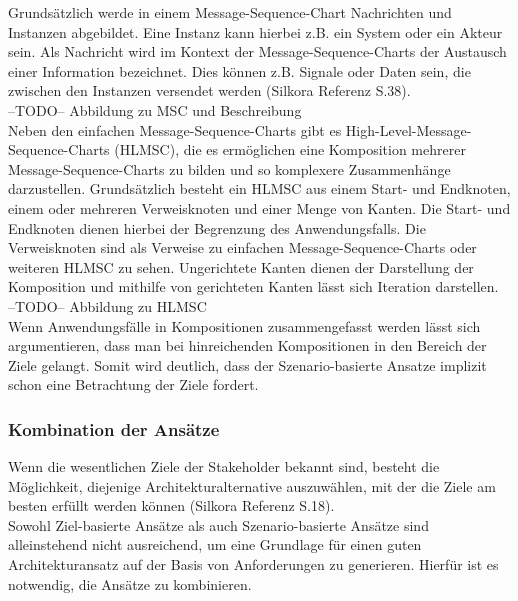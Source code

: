 Grundsätzlich werde in einem Message-Sequence-Chart Nachrichten und Instanzen abgebildet. Eine Instanz kann hierbei z.B. ein System oder ein Akteur sein. Als Nachricht wird im Kontext der Message-Sequence-Charts der Austausch einer Information bezeichnet. Dies können z.B. Signale oder Daten sein, die zwischen den Instanzen versendet werden (Silkora Referenz S.38). \\

--TODO-- Abbildung zu MSC und Beschreibung\\

Neben den einfachen Message-Sequence-Charts gibt es High-Level-Message-Sequence-Charts (HLMSC), die es ermöglichen eine Komposition mehrerer Message-Sequence-Charts zu bilden und so komplexere Zusammenhänge darzustellen. Grundsätzlich besteht ein HLMSC aus einem Start- und Endknoten, einem oder mehreren Verweisknoten und einer Menge von Kanten. Die Start- und Endknoten dienen hierbei der Begrenzung des Anwendungsfalls.  Die Verweisknoten sind als Verweise zu einfachen Message-Sequence-Charts oder weiteren HLMSC zu sehen. Ungerichtete Kanten dienen der Darstellung der Komposition und mithilfe von gerichteten Kanten lässt sich Iteration darstellen.\\

--TODO-- Abbildung zu HLMSC \\

Wenn Anwendungsfälle in Kompositionen zusammengefasst werden lässt sich argumentieren, dass man bei hinreichenden Kompositionen in den Bereich der Ziele gelangt. Somit wird deutlich, dass der Szenario-basierte Ansatze implizit schon eine Betrachtung der Ziele fordert.\\

\subsubsection{Kombination der Ans\"atze}
Wenn die wesentlichen Ziele der Stakeholder bekannt sind, besteht die M\"oglichkeit, diejenige Architekturalternative auszuw\"ahlen, mit der die Ziele am besten erf\"ullt werden k\"onnen (Silkora Referenz S.18).\\

Sowohl Ziel-basierte Ansätze als auch Szenario-basierte Ansätze sind alleinstehend nicht ausreichend, um eine Grundlage für einen guten Architekturansatz auf der Basis von Anforderungen zu generieren. Hierfür ist es notwendig, die Ansätze zu kombinieren. \\

